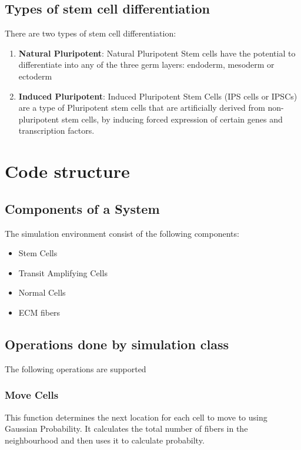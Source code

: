 \documentclass[11pt]{report}
\begin{document}
  
  \section{\color{red}Types of stem cell differentiation}
  There are two types of stem cell differentiation:\\ 
  \begin{enumerate}
   \item \textbf{Natural Pluripotent}: Natural Pluripotent Stem cells have the potential to differentiate into any of the three germ layers: endoderm, mesoderm or ectoderm
   \item \textbf{Induced Pluripotent}: Induced Pluripotent Stem Cells (IPS cells or IPSCs) are a type of Pluripotent stem cells that are artificially derived from non-pluripotent stem cells, by  inducing forced expression of certain genes and transcription factors.

  \end{enumerate}
  
  \chapter{Code structure}
   \section{\color{red} Components of a System}
  The simulation environment consist of the following components:
  \begin{itemize}
   \item Stem Cells
   \item Transit Amplifying Cells
   \item Normal Cells
   \item ECM fibers
  \end{itemize}
  
  \section{\color{red} Operations done by simulation class}
  The following operations are supported
  \subsection{\color{blue}Move Cells}
  This function determines the next location for each cell to move to using Gaussian Probability. It calculates the 
  total number of fibers in the neighbourhood and then uses it to calculate probabilty.
\end{document}
